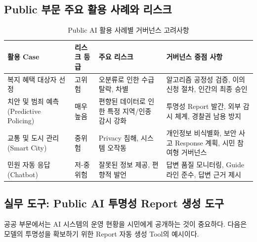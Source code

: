 \subsection{Public 부문 주요 활용 사례와 리스크}
\label{sec:5.3.2}

\begin{table}[htbp]
\centering
\caption{Public AI 활용 사례별 거버넌스 고려사항}
\label{tab:public_ai_cases}
\begin{tabularx}{\textwidth}{p{2.5cm}p{2.5cm}p{2.5cm}X}
\toprule
\textbf{활용 Case} & \textbf{리스크 등급} & \textbf{주요 리스크} & \textbf{거버넌스 중점 사항} \\
\midrule
복지 혜택 대상자 선정 & 고위험 & 오분류로 인한 수급 탈락, 차별 & 알고리즘 공정성 검증, 이의 신청 절차, 인간의 최종 승인 \\
\midrule
치안 및 범죄 예측 (Predictive Policing) & 매우 높음 & 편향된 데이터로 인한 특정 지역/인종 감시 강화 & 투명성 Report 발간, 외부 감시 체계, 경찰권 남용 방지 \\
\midrule
교통 및 도시 관리 (Smart City) & 중위험 & Privacy 침해, 시스템 오작동 & 개인정보 비식별화, 보안 사고 Response 계획, 시민 참여형 거버넌스 \\
\midrule
민원 자동 응답 (Chatbot) & 저-중위험 & 잘못된 정보 제공, 편향적 발언 & 답변 품질 모니터링, Guide라인 준수, 답변 근거 제시 \\
\bottomrule
\end{tabularx}
\end{table}


\subsection{실무 도구: Public AI 투명성 Report 생성 도구}
\label{sec:5.3.3}

공공 부문에서는 AI 시스템의 운영 현황을 시민에게 공개하는 것이 중요하다. 다음은 모델의 투명성을 확보하기 위한 Report 자동 생성 Tool의 예시이다.

